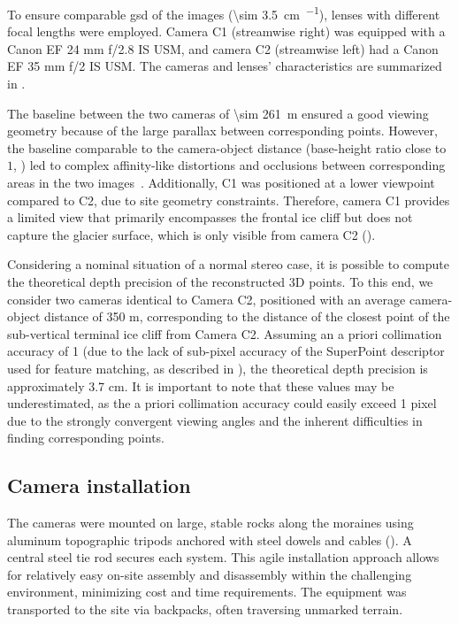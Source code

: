 To ensure comparable \ac{gsd} of the images (\SI{\sim 3.5}{\centi\meter\per\pixel}), lenses with different focal lengths were employed. 
Camera C1 (streamwise right) was equipped with a Canon EF 24 mm f/2.8 IS USM, and camera C2 (streamwise left) had a Canon EF 35 mm f/2 IS USM.
The cameras and lenses' characteristics are summarized in .

The baseline between the two cameras of \SI{\sim 261}{\meter} ensured a good viewing geometry because of the large parallax between corresponding points.
However, the baseline comparable to the camera-object distance (base-height ratio close to \(1\), ) led to complex affinity-like distortions and occlusions between corresponding areas in the two images~\citep{Yao_2021}.
Additionally, C1 was positioned at a lower viewpoint compared to C2, due to site geometry constraints.
Therefore, camera C1 provides a limited view that primarily encompasses the frontal ice cliff but does not capture the glacier surface, which is only visible from camera C2 ().

Considering a nominal situation of a normal stereo case, it is possible to compute the theoretical depth precision of the reconstructed 3D points. To this end, we consider two cameras identical to Camera C2, positioned with an average camera-object distance of 350 m, corresponding to the distance of the closest point of the sub-vertical terminal ice cliff from Camera C2. 
Assuming an a priori collimation accuracy of \SI{1}{\pixel} (due to the lack of sub-pixel accuracy of the SuperPoint descriptor used for feature matching, as described in ), the theoretical depth precision is approximately 3.7 cm.
It is important to note that these values may be underestimated, as the a priori collimation accuracy could easily exceed 1 pixel due to the strongly convergent viewing angles and the inherent difficulties in finding corresponding points.

\subsection{Camera installation}\label{sec:4:cameramonumentation}
The cameras were mounted on large, stable rocks along the moraines using aluminum topographic tripods anchored with steel dowels and cables (). 
A central steel tie rod secures each system. 
This agile installation approach allows for relatively easy on-site assembly and disassembly within the challenging environment, minimizing cost and time requirements. 
The equipment was transported to the site via backpacks, often traversing unmarked terrain.

